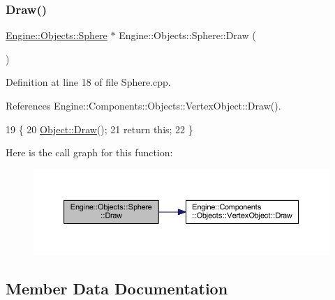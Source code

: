 \subsubsection{\texorpdfstring{Draw()}{Draw()}}
{\footnotesize\ttfamily \mbox{\hyperlink{classEngine_1_1Objects_1_1Sphere}{Engine\+::\+Objects\+::\+Sphere}} $\ast$ Engine\+::\+Objects\+::\+Sphere\+::\+Draw (\begin{DoxyParamCaption}{ }\end{DoxyParamCaption})}



Definition at line 18 of file Sphere.\+cpp.



References Engine\+::\+Components\+::\+Objects\+::\+Vertex\+Object\+::\+Draw().


\begin{DoxyCode}
19 \{
20     \mbox{\hyperlink{classEngine_1_1Components_1_1Objects_1_1VertexObject_a53a8f546ee082720579e2c33be6cedec}{Object::Draw}}();
21     \textcolor{keywordflow}{return} \textcolor{keyword}{this};
22 \}
\end{DoxyCode}
Here is the call graph for this function\+:
\nopagebreak
\begin{figure}[H]
\begin{center}
\leavevmode
\includegraphics[width=350pt]{classEngine_1_1Objects_1_1Sphere_a7cc1ef27c2634c763273ed84065b217a_cgraph}
\end{center}
\end{figure}


\subsection{Member Data Documentation}
\mbox{\label{classEngine_1_1Components_1_1Objects_1_1VertexObject_a401aa1eb0254e57d8295c2287749eed5}} 
